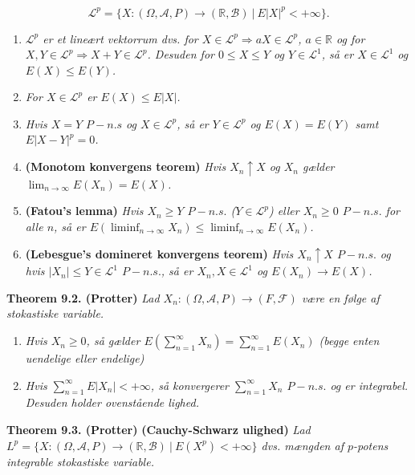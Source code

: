 \documentclass[
]{book}
\providecommand{\tightlist}{%
  \setlength{\itemsep}{0pt}\setlength{\parskip}{0pt}}
\begin{document}
\[
\mathcal{L}^p=\{X : (\Omega,\mathcal{A},P)\to(\mathbb{R},\mathcal{B})\ \vert\ E\vert X\vert^p< +\infty\}.
\]

\begin{enumerate}
\def\labelenumi{\alph{enumi}.}
\tightlist
\item
  \emph{\(\mathcal{L}^p\) er et lineært vektorrum dvs. for \(X\in \mathcal{L}^p\Rightarrow aX\in\mathcal{L}^p\), \(a\in\mathbb{R}\) og for \(X,Y\in\mathcal{L}^p\Rightarrow X+Y\in\mathcal{L}^p\). Desuden for \(0\le X\le Y\) og \(Y\in\mathcal{L}^1\), så er \(X\in\mathcal{L}^1\) og \(E(X)\le E(Y)\).}
\item
  \emph{For \(X\in\mathcal{L}^p\) er \(E(X)\le E\vert X\vert\).}
\item
  \emph{Hvis \(X=Y\) \(P-n.s\) og \(X\in\mathcal{L}^p\), så er \(Y\in\mathcal{L}^p\) og \(E(X)=E(Y)\) samt \(E\vert X-Y\vert^p=0\).}
\item
  \textbf{(Monotom konvergens teorem)} \emph{Hvis \(X_n\uparrow X\) og \(X_n\) gælder \(\lim_{n\to \infty} E(X_n)=E(X)\).}
\item
  \textbf{(Fatou's lemma)} \emph{Hvis \(X_n\ge Y\) \(P-n.s.\) (\(Y\in\mathcal{L}^p\)) eller \(X_n\ge 0\) \(P-n.s.\) for alle \(n\), så er \(E(\liminf_{n\to\infty}X_n)\le \liminf_{n\to \infty} E(X_n)\).}
\item
  \textbf{(Lebesgue's domineret konvergens teorem)} \emph{Hvis \(X_n\uparrow X\) \(P-n.s.\) og hvis \(\vert X_n\vert \le Y\in\mathcal{L}^1\) \(P-n.s.\), så er \(X_n,X\in\mathcal{L}^1\) og \(E(X_n)\to E(X)\).}
\end{enumerate}

\textbf{Theorem 9.2. (Protter)} \emph{Lad \(X_n : (\Omega,\mathcal{A},P)\to(F,\mathcal{F})\) være en følge af stokastiske variable.}

\begin{enumerate}
\def\labelenumi{\alph{enumi}.}
\tightlist
\item
  \emph{Hvis \(X_n\ge0\), så gælder \(E\left(\sum_{n=1}^\infty X_n\right)=\sum_{n=1}^\infty E(X_n)\) (begge enten uendelige eller endelige)}
\item
  \emph{Hvis \(\sum_{n=1}^\infty E\vert X_n\vert <+\infty\), så konvergerer \(\sum_{n=1}^\infty X_n\) \(P-n.s.\) og er integrabel. Desuden holder ovenstående lighed.}
\end{enumerate}

\textbf{Theorem 9.3. (Protter)} \textbf{(Cauchy-Schwarz ulighed)} \emph{Lad \(L^p=\{X : (\Omega,\mathcal{A},P)\to(\mathbb{R},\mathcal{B})\ \vert\ E(X^p)< +\infty\}\) dvs. mængden af \(p\)-potens integrable stokastiske variable.}
\end{document}
